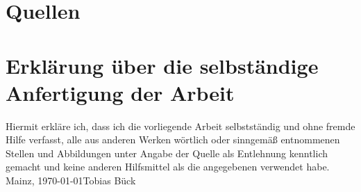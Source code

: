 \documentclass[a4paper,12pt,arial]{scrartcl}
\newcommand{\Name}{Tobias Bück}
\newcommand{\Ort}{Mainz}
\begin{document}
\section{Quellen}

\printbibheading
\printbibliography[omitnumbers=false,type=online,heading=subbibliography,title={Digital}]


  
\printbibliography[nottype=online, heading=subbibliography, title=Bücher]



\section{Erklärung über die selbständige Anfertigung der Arbeit}
Hiermit erkläre ich, dass ich die vorliegende Arbeit selbstständig und ohne fremde Hilfe verfasst, alle aus anderen Werken wörtlich oder sinngemäß entnommenen Stellen und Abbildungen unter Angabe der Quelle als Entlehnung kenntlich gemacht und keine anderen Hilfsmittel als die angegebenen verwendet habe. \\
\Ort, \today \space \Name
\end{document}
